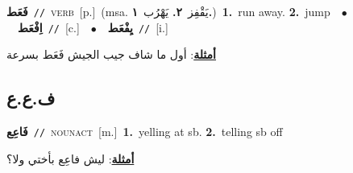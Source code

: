 \documentclass[10pt,a4paper,twoside]{article} %
\begin{document}
\begin{multicols}{2}
{\setlength\topsep{0pt}\textbf{\foreignlanguage{arabic}{فَعَط}}\ {\color{gray}\texttt{//}\color{black}}\ \textsc{verb}\ [p.]\ \color{gray}(msa. \foreignlanguage{arabic}{يَقْفِز}~\foreignlanguage{arabic}{\textbf{٢.}}  \foreignlanguage{arabic}{يَهْرُب}~\foreignlanguage{arabic}{\textbf{١.}})\color{black}\ \textbf{1.}~run away.  \textbf{2.}~jump\ \ $\bullet$\ \ \setlength\topsep{0pt}\textbf{\foreignlanguage{arabic}{اِفْعَط}}\ {\color{gray}\texttt{//}\color{black}}\ [c.]\ \ $\bullet$\ \ \setlength\topsep{0pt}\textbf{\foreignlanguage{arabic}{يِفْعَط}}\ {\color{gray}\texttt{//}\color{black}}\ [i.]\  \begin{flushright}\color{gray}\foreignlanguage{arabic}{\textbf{\underline{\foreignlanguage{arabic}{أمثلة}}}: أول ما شاف جيب الجيش فَعَط بسرعة}\end{flushright}\color{black}} \vspace{2mm}

\vspace{-3mm}
\subsection*{\color{blue}\foreignlanguage{arabic}{ف.ع.ع}\color{blue}{}} 

{\setlength\topsep{0pt}\textbf{\foreignlanguage{arabic}{فَاعِع}}\ {\color{gray}\texttt{//}\color{black}}\ \textsc{noun\textunderscore act}\ [m.]\ \textbf{1.}~yelling at sb.  \textbf{2.}~telling sb off\  \begin{flushright}\color{gray}\foreignlanguage{arabic}{\textbf{\underline{\foreignlanguage{arabic}{أمثلة}}}: ليش فاعِع بأختي ولا؟}\end{flushright}\color{black}} \vspace{2mm}


\end{multicols}
\end{document}
